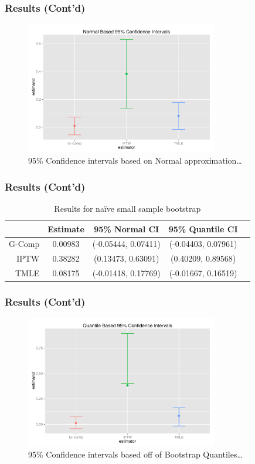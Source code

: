 \documentclass{beamer}
\begin{document}
\begin{frame}
\frametitle{Results (Cont'd)}
\begin{figure}[ht!]
\centering
\includegraphics[width=0.75\textwidth]{bootstrap-normal-ci.pdf}
\caption{95\% Confidence intervals based on Normal approximation\ldots}
\end{figure}
\end{frame}

\begin{frame}
\frametitle{Results (Cont'd)}
\begin{table}[ht]
\centering
{\small
\begin{tabular}{rcccc}
  \hline
 & Estimate & 95\% Normal CI & 95\% Quantile CI \\ 
  \hline
G-Comp & 0.00983 & (-0.05444, 0.07411) & (-0.04403, 0.07961) \\ 
  IPTW & 0.38282 & (0.13473, 0.63091) & (0.40209, 0.89568) \\ 
  TMLE & 0.08175 & (-0.01418, 0.17769) & (-0.01667, 0.16519) \\ 
   \hline
\end{tabular}
}
\caption{Results for na\"{i}ve small sample bootstrap}
\end{table}
\end{frame}

\begin{frame}
\frametitle{Results (Cont'd)}
\begin{figure}[ht!]
\centering
\includegraphics[width=0.75\textwidth]{bootstrap-quantile-ci.pdf}
\caption{95\% Confidence intervals based off of Bootstrap Quantiles\ldots}
\end{figure}
\end{frame}
\end{document}
